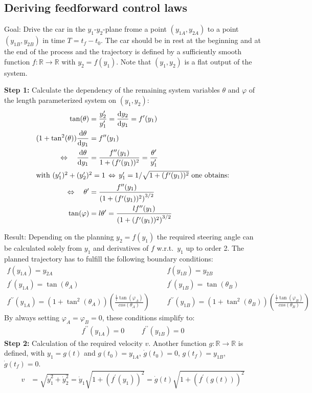 \documentclass[a4paper,11pt,headings=standardclasses,parskip=half]{scrartcl}
\newcommand{\yIZ}{y_{1A}}
\newcommand{\yIIZ}{y_{2A}}
\newcommand{\yIT}{y_{1B}}
\newcommand{\yIIT}{y_{2B}}
\newcommand{\diff}[2]{\frac{\text{d}#1}{\text{d}#2}}
\begin{document}
\subsection{Deriving feedforward control laws}
Goal: Drive the car in the $y_1$-$y_2$-plane frome a point $(\yIZ, \yIIZ)$ to a point $(\yIT, \yIIT)$ in time $T=t_f-t_0$. The car should be in rest at the beginning and at the end of the process and the trajectory is defined by a sufficiently smooth function $f : \mathbb{R} \to \mathbb{R}$ with $y_2 = f(y_1)$. Note that $(y_1, y_2)$ is a flat output of the system.

\textbf{Step 1:} Calculate the dependency of the remaining system variables $\theta$ and $\varphi$ of the  length parameterized system on $(y_1, y_2)$:
\begin{align}
\tan(\theta) &= \frac{y_2^\prime}{y_1^\prime} = \diff{y_2}{y_1} = f^\prime(y_1)\\
(1 + \tan^2(\theta))\diff{\theta}{y_1} &= f^{\prime\prime}(y_1) \nonumber \\
\Leftrightarrow \quad \diff{\theta}{y_1}&= \frac{f^{\prime\prime}(y_1)}{1 + (f^\prime(y_1))^2} = \frac{\theta^\prime}{y_1^\prime} \nonumber\\
\intertext{with $(y_1^\prime)^2 + (y_2^\prime)^2 = 1 \, \Leftrightarrow \, y_1^\prime = 1/\sqrt{1 + (f^\prime(y_1))^2}$ one obtains:}
\Leftrightarrow \quad \theta^\prime &= \frac{f^{\prime\prime}(y_1)}{\left(1 + (f^\prime(y_1))^2\right)^{3/2}}\\
\tan(\varphi) &= l\theta^\prime = \frac{lf^{\prime\prime}(y_1)}{\left(1 + (f^\prime(y_1))^2\right)^{3/2}}
\end{align}

Result: Depending on the planning $y_2 = f(y_1)$ the required steering angle can be calculated solely from $y_1$ and derivatives of $f$ w.r.t.~$y_1$ up to order 2. The planned trajectory has to fulfill the following boundary conditions:
\begin{align*}
f(\yIZ) = \yIIZ &&& f(\yIT) = \yIIT \\
f^\prime(\yIZ) = \tan(\theta_A) &&& f^\prime(\yIT) = \tan(\theta_B) \\
f^{\prime\prime}(\yIZ) = (1+\tan^2(\theta_A))\left(\frac{\frac{1}{l}\tan(\varphi_A)}{cos(\theta_A)}\right) &&& 
f^{\prime\prime}(\yIT) = (1+\tan^2(\theta_B))\left(\frac{\frac{1}{l}\tan(\varphi_B)}{cos(\theta_B)}\right) 
\end{align*}
By always setting $\varphi_A=\varphi_B=0$, these conditions simplify to:
\begin{align*}
f^{\prime\prime}(\yIZ) = 0 &&& f^{\prime\prime}(\yIT) = 0
\end{align*}
\textbf{Step 2:} Calculation of the required velocity $v$. Another function $g: \mathbb{R} \to \mathbb{R}$ is defined, with $y_1 = g(t)$ and $g(t_0) = \yIZ$, $\dot g(t_0) = 0$, $g(t_f) = \yIT$, $\dot g(t_f) = 0$. 
\begin{align}
v &= \sqrt{\dot y_1^2 + \dot y_2^2} = \dot y_1\sqrt{1 + (f^\prime(y_1))^2} = \dot g(t) \sqrt{1 + (f^\prime(g(t)))^2}
\end{align}
\end{document}
